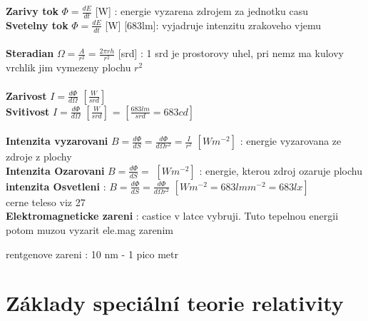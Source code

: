 \documentclass{report}
\begin{document}
\textbf{Zarivy tok} $\Phi=\frac{dE}{dt}$ [W] : energie vyzarena zdrojem za jednotku casu \\
\textbf{Svetelny tok} $\Phi=\frac{dE}{dt}$ [W] [683lm]: vyjadruje intenzitu zrakoveho vjemu \\
\ \\
\textbf{Steradian} $\Omega=\frac{A}{r^2}=\frac{2\pi rh}{r^2}$ [srd] : 1 srd je prostorovy uhel, pri nemz ma kulovy vrchlik jim vymezeny plochu $r^2$ \\
\ \\
\textbf{Zarivost} $I=\frac{d \Phi}{d \Omega}$ $[\frac{W}{srd}]$ \\
\textbf{Svitivost} $I=\frac{d \Phi}{d \Omega}$ $[\frac{W}{srd}]$ = $[\frac{683 lm}{srd}= 683cd]$ \\
\ \\
\textbf{Intenzita vyzarovani} $B=\frac{d\Phi}{dS}=\frac{d \Phi}{d\Omega r^2}=\frac{I}{r^2}$ $[Wm^{-2}]$ : energie vyzarovana ze zdroje z plochy \\
\textbf{Intenzita Ozarovani} $B=\frac{d\Phi}{dS}=$ $[Wm^{-2}]$ : energie, kterou zdroj ozaruje plochu \\
\textbf{intenzita Osvetleni} : $B=\frac{d\Phi}{dS}=\frac{d \Phi}{d\Omega r^2}$ $[Wm^{-2}=683 lm m^{-2}=683 lx]$ \\

cerne teleso viz  27 \\
\textbf{Elektromagneticke zareni} : castice v latce vybruji. Tuto tepelnou energii potom muzou vyzarit ele.mag zarenim \\

rentgenove zareni : 10 nm - 1 pico metr

\newpage


\section{Základy speciální teorie relativity}
\end{document}
